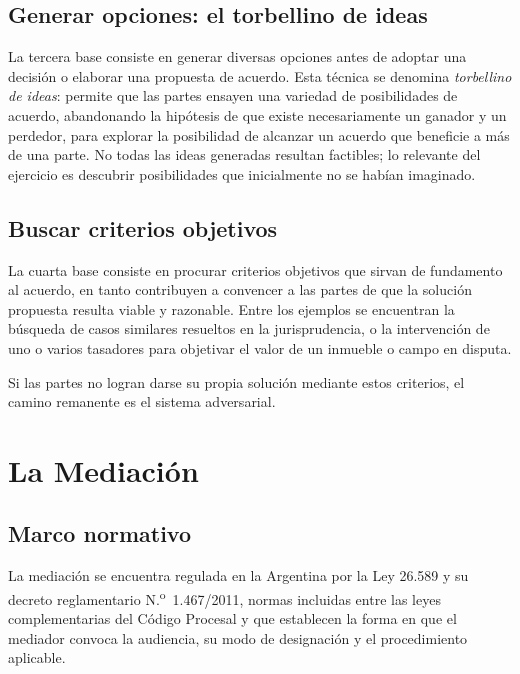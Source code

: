 \documentclass[12pt,oneside]{book}
\begin{document}
\section{Generar opciones: el torbellino de ideas}

La tercera base consiste en generar diversas opciones antes de adoptar una decisión o elaborar una propuesta de acuerdo. Esta técnica se denomina \textit{torbellino de ideas}: permite que las partes ensayen una variedad de posibilidades de acuerdo, abandonando la hipótesis de que existe necesariamente un ganador y un perdedor, para explorar la posibilidad de alcanzar un acuerdo que beneficie a más de una parte. No todas las ideas generadas resultan factibles; lo relevante del ejercicio es descubrir posibilidades que inicialmente no se habían imaginado.

\section{Buscar criterios objetivos}

La cuarta base consiste en procurar criterios objetivos que sirvan de fundamento al acuerdo, en tanto contribuyen a convencer a las partes de que la solución propuesta resulta viable y razonable. Entre los ejemplos se encuentran la búsqueda de casos similares resueltos en la jurisprudencia, o la intervención de uno o varios tasadores para objetivar el valor de un inmueble o campo en disputa.

\begin{note}
Si las partes no logran darse su propia solución mediante estos criterios, el camino remanente es el sistema adversarial.
\end{note}

\chapter{La Mediación}

\section{Marco normativo}

La mediación se encuentra regulada en la Argentina por la Ley 26.589 y su decreto reglamentario N.\textsuperscript{o}~1.467/2011, normas incluidas entre las leyes complementarias del Código Procesal y que establecen la forma en que el mediador convoca la audiencia, su modo de designación y el procedimiento aplicable.
\end{document}
